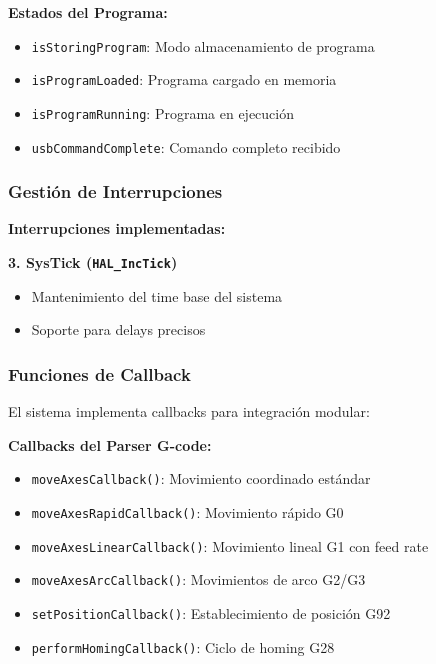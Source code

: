 \documentclass[12pt]{article}
\begin{document}
\textbf{Estados del Programa:}
\begin{itemize}
    \item \texttt{isStoringProgram}: Modo almacenamiento de programa
    \item \texttt{isProgramLoaded}: Programa cargado en memoria
    \item \texttt{isProgramRunning}: Programa en ejecución
    \item \texttt{usbCommandComplete}: Comando completo recibido
\end{itemize}

\subsubsection{Gestión de Interrupciones}

\textbf{Interrupciones implementadas:}



\textbf{3. SysTick (\texttt{HAL\_IncTick})}
\begin{itemize}
    \item Mantenimiento del time base del sistema
    \item Soporte para delays precisos
\end{itemize}

\subsubsection{Funciones de Callback}

El sistema implementa callbacks para integración modular:

\textbf{Callbacks del Parser G-code:}
\begin{itemize}
    \item \texttt{moveAxesCallback()}: Movimiento coordinado estándar
    \item \texttt{moveAxesRapidCallback()}: Movimiento rápido G0
    \item \texttt{moveAxesLinearCallback()}: Movimiento lineal G1 con feed rate
    \item \texttt{moveAxesArcCallback()}: Movimientos de arco G2/G3
    \item \texttt{setPositionCallback()}: Establecimiento de posición G92
    \item \texttt{performHomingCallback()}: Ciclo de homing G28
\end{itemize}
\end{document}
